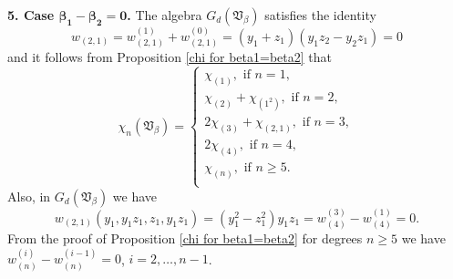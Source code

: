 \documentclass{amsart}
\theoremstyle{definition}
\begin{document}
{\bf 5. Case $\bm{\beta_1-\beta_2=0}$.} The algebra $G_d({\mathfrak V}_{\beta})$ satisfies the identity
\[
w_{(2,1)}=w_{(2,1)}^{(1)}+w_{(2,1)}^{(0)}=(y_1+z_1)(y_1z_2-y_2z_1)=0
\]
and it follows from Proposition \ref{chi for beta1=beta2} that
\[
\chi_n({\mathfrak V}_{\beta})=\begin{cases}
\chi_{(1)},\text{ if }n=1,\\
\chi_{(2)}+\chi_{(1^2)},\text{ if }n=2,\\
2\chi_{(3)}+\chi_{(2,1)},\text{ if }n=3,\\
2\chi_{(4)},\text{ if }n=4,\\
\chi_{(n)},\text{ if }n\geq 5.\\
\end{cases}
\]
Also, in $G_d({\mathfrak V}_{\beta})$ we have
\[
w_{(2,1)}(y_1,y_1z_1,z_1,y_1z_1)=(y_1^2-z_1^2)y_1z_1=w_{(4)}^{(3)}-w_{(4)}^{(1)}=0.
\]
From the proof of Proposition \ref{chi for beta1=beta2} for degrees $n\geq 5$ we have $w_{(n)}^{(i)}-w_{(n)}^{(i-1)}=0$, $i=2,\ldots,n-1$.
\end{document}
